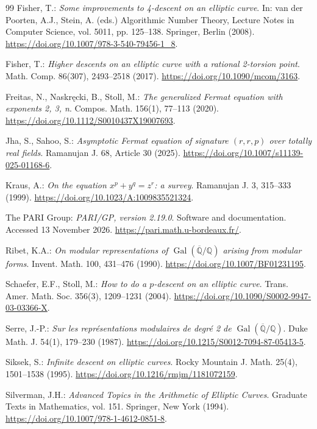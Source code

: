 \documentclass[11pt,a4paper]{article}
\theoremstyle{definition}\newtheorem{definition}[theorem]{Definition}
\theoremstyle{remark}\newtheorem{remark}[theorem]{Remark}
\begin{document}
\begin{thebibliography}{99}
Fisher, T.: \emph{Some improvements to 4-descent on an elliptic curve}. In: van der Poorten, A.J., Stein, A. (eds.) Algorithmic Number Theory, Lecture Notes in Computer Science, vol. 5011, pp. 125--138. Springer, Berlin (2008). \url{https://doi.org/10.1007/978-3-540-79456-1_8}.

Fisher, T.: \emph{Higher descents on an elliptic curve with a rational 2-torsion point}. Math. Comp. 86(307), 2493--2518 (2017). \url{https://doi.org/10.1090/mcom/3163}.

Freitas, N., Naskr\k{e}cki, B., Stoll, M.: \emph{The generalized Fermat equation with exponents 2, 3, n}. Compos. Math. 156(1), 77--113 (2020). \url{https://doi.org/10.1112/S0010437X19007693}.

Jha, S., Sahoo, S.: \emph{Asymptotic Fermat equation of signature $(r,r,p)$ over totally real fields}. Ramanujan J. 68, Article 30 (2025). \url{https://doi.org/10.1007/s11139-025-01168-6}.

Kraus, A.: \emph{On the equation $x^p+y^q=z^r$: a survey}. Ramanujan J. 3, 315--333 (1999). \url{https://doi.org/10.1023/A:1009835521324}.

The PARI Group: \emph{PARI/GP, version 2.19.0}. Software and documentation. Accessed 13 November 2026. \url{https://pari.math.u-bordeaux.fr/}.

Ribet, K.A.: \emph{On modular representations of $\operatorname{Gal}(\overline{\mathbb Q}/\mathbb Q)$ arising from modular forms}. Invent. Math. 100, 431--476 (1990). \url{https://doi.org/10.1007/BF01231195}.

Schaefer, E.F., Stoll, M.: \emph{How to do a $p$-descent on an elliptic curve}. Trans. Amer. Math. Soc. 356(3), 1209--1231 (2004). \url{https://doi.org/10.1090/S0002-9947-03-03366-X}.

Serre, J.-P.: \emph{Sur les repr\'esentations modulaires de degr\'e 2 de $\operatorname{Gal}(\overline{\mathbb Q}/\mathbb Q)$}. Duke Math. J. 54(1), 179--230 (1987). \url{https://doi.org/10.1215/S0012-7094-87-05413-5}.

Siksek, S.: \emph{Infinite descent on elliptic curves}. Rocky Mountain J. Math. 25(4), 1501--1538 (1995). \url{https://doi.org/10.1216/rmjm/1181072159}.

Silverman, J.H.: \emph{Advanced Topics in the Arithmetic of Elliptic Curves}. Graduate Texts in Mathematics, vol. 151. Springer, New York (1994). \url{https://doi.org/10.1007/978-1-4612-0851-8}.


\end{thebibliography}
\end{document}
